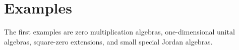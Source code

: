 \section{Examples}

The first examples are zero multiplication algebras, one-dimensional unital
algebras, square-zero extensions, and small special Jordan algebras.
